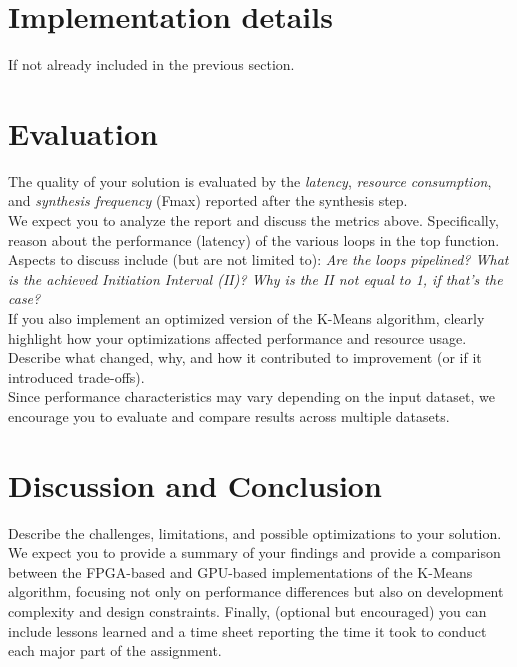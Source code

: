 \documentclass[sigconf, nonacm, review]{acmart}
\begin{document}
\section{Implementation details}
If not already included in the previous section.

\section{Evaluation}

The quality of your solution is evaluated by the \textit{latency}, \textit{resource consumption}, and \textit{synthesis frequency} (Fmax) reported after the synthesis step.\\ 

\noindent
We expect you to analyze the report and discuss the metrics above. Specifically, reason about the performance (latency) of the various loops in the top function.  Aspects to discuss include (but are not limited to): \textit{Are the loops pipelined? What is the achieved Initiation Interval (II)? Why is the II not equal to 1, if that's the case?}\\

\noindent
If you also implement an optimized version of the K-Means algorithm, clearly highlight how your optimizations affected performance and resource usage. Describe what changed, why, and how it contributed to improvement (or if it introduced trade-offs).\\

\noindent
Since performance characteristics may vary depending on the input dataset, we encourage you to evaluate and compare results across multiple datasets.


\section{Discussion and Conclusion}

Describe the challenges, limitations, and possible optimizations to your solution. We expect you to provide a summary of your findings and provide a comparison between the FPGA-based and GPU-based implementations of the K-Means algorithm, focusing not only on performance differences but also on development complexity and design constraints.  Finally, (optional but encouraged) you can include lessons learned and a time sheet reporting the time it took to conduct each major part of the assignment.




\end{document}

